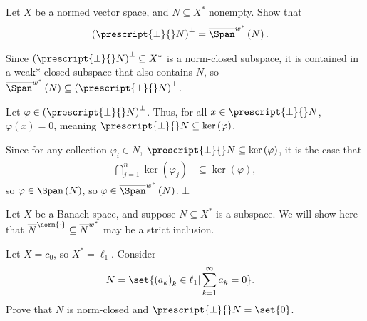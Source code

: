 \documentclass[10pt]{mypackage}
\begin{document}
\begin{exercise}
  Let $X$ be a normed vector space, and $N\subseteq X^{\ast}$ nonempty. Show that
  \begin{align*}
    \left(\prescript{\perp}{}N\right)^{\perp} &= \overline{\Span}^{w^{\ast}}\left(N\right).
  \end{align*}
\end{exercise}
\begin{solution}
  Since $\left(\prescript{\perp}{}N\right)^{\perp}\subseteq X^{\ast}$ is a norm-closed subspace, it is contained in a weak*-closed subspace that also contains $N$, so $\overline{\Span}^{w^{\ast}}\left(N\right)\subseteq \left(\prescript{\perp}{}N\right)^{\perp}$.\newline

  Let $\varphi\in \left(\prescript{\perp}{}N\right)^{\perp}$. Thus, for all $x\in \prescript{\perp}{}N$, $\varphi(x) = 0$, meaning $\prescript{\perp}{}N \subseteq \ker\left(\varphi\right)$.\newline

  Since for any collection $\varphi_i\in N$, $\prescript{\perp}{}N\subseteq \ker\left(\varphi\right)$, it is the case that
  \begin{align*}
    \bigcap_{j=1}^{n}\ker\left(\varphi_j\right) &\subseteq \ker\left(\varphi\right),
  \end{align*}
  so $\varphi\in \Span\left(N\right)$, so $\varphi\in \overline{\Span}^{w^{\ast}}\left(N\right)$. $\bot$
\end{solution}
\begin{exercise}
  Let $X$ be a Banach space, and suppose $N\subseteq X^{\ast}$ is a subspace. We will show here that $\overline{N}^{\norm{\cdot}}\subseteq \overline{N}^{w^{\ast}}$ may be a strict inclusion.\newline

  Let $X = c_0$, so $X^{\ast} = \ell_1$. Consider
  \begin{align*}
    N &= \set{\left(a_k\right)_k\in \ell_1 | \sum_{k=1}^{\infty}a_k = 0}.
  \end{align*}
  Prove that $N$ is norm-closed and $\prescript{\perp}{}N = \set{0}$.
\end{exercise}
\end{document}
